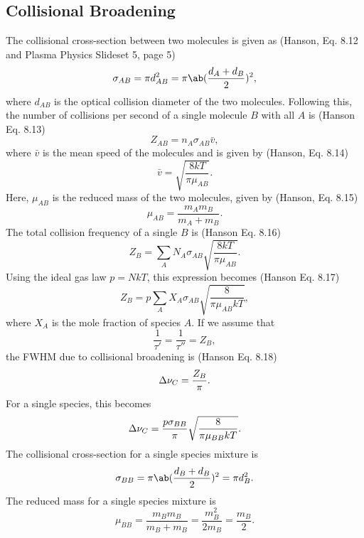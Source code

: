 \documentclass[11pt, twoside, fleqn]{report}
\begin{document}
\subsection{Collisional Broadening}

The collisional cross-section between two molecules is given as (Hanson, Eq. 8.12 and Plasma Physics Slideset 5, page 5)
\begin{equation*}
    \sigma_{AB} = \pi d_{AB}^{2} = \pi\ab(\frac{d_{A} + d_{B}}{2})^{2},
\end{equation*}
where $d_{AB}$ is the optical collision diameter of the two molecules. Following this, the number of collisions per second of a single molecule $B$ with all $A$ is (Hanson Eq. 8.13)
\begin{equation*}
    Z_{AB} = n_{A}\sigma_{AB}\bar{v},
\end{equation*}
where $\bar{v}$ is the mean speed of the molecules and is given by (Hanson, Eq. 8.14)
\begin{equation*}
    \bar{v} = \sqrt{\frac{8kT}{\pi\mu_{AB}}}.
\end{equation*}
Here, $\mu_{AB}$ is the reduced mass of the two molecules, given by (Hanson, Eq. 8.15)
\begin{equation*}
    \mu_{AB} = \frac{m_{A}m_{B}}{m_{A} + m_{B}}.
\end{equation*}
The total collision frequency of a single $B$ is (Hanson Eq. 8.16)
\begin{equation*}
    Z_{B} = \sum_{A}N_{A}\sigma_{AB}\sqrt{\frac{8kT}{\pi\mu_{AB}}}.
\end{equation*}
Using the ideal gas law $p = NkT$, this expression becomes (Hanson Eq. 8.17)
\begin{equation*}
    Z_{B} = p\sum_{A}X_{A}\sigma_{AB}\sqrt{\frac{8}{\pi\mu_{AB}kT}},
\end{equation*}
where $X_{A}$ is the mole fraction of species $A$. If we assume that
\begin{equation*}
    \frac{1}{\tau'} = \frac{1}{\tau''} = Z_{B},
\end{equation*}
the FWHM due to collisional broadening is (Hanson Eq. 8.18)
\begin{equation*}
    \adif{\nu}_{C} = \frac{Z_{B}}{\pi}.
\end{equation*}
For a single species, this becomes
\begin{equation*}
    \adif{\nu}_{C} = \frac{p\sigma_{BB}}{\pi}\sqrt{\frac{8}{\pi\mu_{BB}kT}}.
\end{equation*}
The collisional cross-section for a single species mixture is
\begin{equation*}
    \sigma_{BB} = \pi\ab(\frac{d_{B} + d_{B}}{2})^{2} = \pi d_{B}^{2}.
\end{equation*}
The reduced mass for a single species mixture is
\begin{equation*}
    \mu_{BB} = \frac{m_{B}m_{B}}{m_{B} + m_{B}} = \frac{m_{B}^{2}}{2m_{B}} = \frac{m_{B}}{2}.
\end{equation*}
\end{document}
